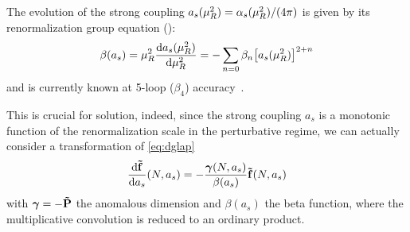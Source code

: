 The evolution of the strong coupling $a_s(\mu_R^2) = \alpha_s(\mu_R^2)/(4\pi)$
is given by its renormalization group equation (\rge):
\begin{equation}
    \beta(a_s) = \muR^2\dv{a_s(\muR^2)}{\muR^2}{} = - \sum\limits_{n=0} \beta_n \qty[a_s(\muR^2)]^{2+n}
\end{equation}
and is currently known at 5-loop ($\beta_4$)
accuracy~\cite{Herzog:2017ohr,Luthe:2016ima,Baikov:2016tgj,Chetyrkin:2017bjc,Luthe:2017ttg}.

This is crucial for \dglap{} solution, indeed, since the strong coupling $a_s$
is a monotonic function of the renormalization scale in the perturbative
regime, we can actually consider a transformation of
\cref{eq:dglap}
\begin{equation}
    \dv{\vb{\tilde f}}{a_s}{}(N,a_s) = - \frac{\bm{\gamma}(N,a_s)}{\beta(a_s)} \vb {\tilde f}(N, a_s)
    \label{eq:dglap2}
\end{equation}
with $\bm{\gamma} = - \vb{\tilde P}$ the anomalous dimension and $\beta(a_s)$
the \qcd{} beta function, where the multiplicative convolution is reduced to an
ordinary product.

